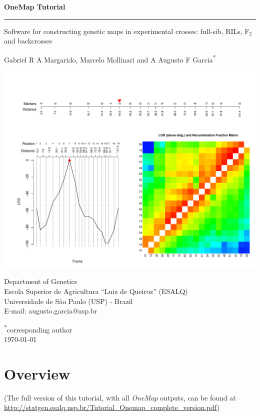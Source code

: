\documentclass[letterpaper,12pt,oneside]{article}
\renewcommand{\baselinestretch}{1.3}
\begin{document}
\begin{titlepage}
  {\LARGE {\bf OneMap Tutorial}}
  \medskip\hrule height 2pt
  \vspace{.08in}

  {\flushright Software for constructing genetic maps in experimental crosses: full-sib, RILs, F$_2$ and backcrosses}
  
  \vspace{.4in}
  
  \begin{center}
    Gabriel R A Margarido,  Marcelo Mollinari and  A Augusto F Garcia\textsuperscript{*}
  \end{center}
  
  \vspace{.3in}
  
  \centering
  \includegraphics[width=.8\textwidth]{figures/tutorial}
  
 
  
  \vspace{.8in}
  
  {\renewcommand{\baselinestretch}{3}
    Department of Genetics\\
    Escola Superior de Agricultura ``Luiz de Queiroz'' (ESALQ)\\
    Universidade de S\~ao Paulo (USP) - Brazil\\
    E-mail: augusto.garcia@usp.br
  }

\vspace{0.5cm}
\noindent \textsuperscript{*}corresponding author\\
\today
 \end{titlepage}

\tableofcontents
\newpage


\section{Overview}
\label{overview}
(The full version of this tutorial, with all \textsl{OneMap} outputs,
can be found at \url{http://statgen.esalq.usp.br/Tutorial_Onemap_complete_version.pdf})
\end{document}
